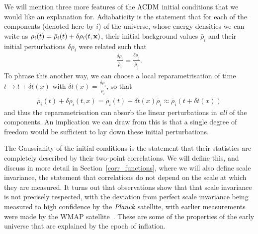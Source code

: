 

    We will mention three more features of the $\Lambda\text{CDM}$ initial conditions that we would
    like an explanation for.
    Adiabaticity is the statement that for each of the components (denoted here by $i$) of the universe,
    whose energy densities we can write as
    $\rho_i(t) = \bar{\rho}_i(t)+\delta\rho_i(t,\mathbf{x})$, their
    initial background values $\bar{\rho}_i$ and their
    initial perturbations $\delta\rho_i$ were related such that
    \begin{align}
        \frac{\delta\rho_i}{\dot{\bar{\rho}}_i} = \frac{\delta\rho_j}{\dot{\bar{\rho}}_j}.
    \end{align}
    To phrase this another way, we can choose a local reparametrisation of time $t\rightarrow t+\delta t(x)$
    with $\delta t(x)=\frac{\delta\rho_i}{\dot{\bar{\rho}}_i}$, so that
    \begin{align}
        \bar{\rho}_i(t)+\delta \rho_i(t,x) = \bar{\rho}_i(t)+\delta t(x)\dot{\bar{\rho}}_i
        \approx \bar{\rho}_i(t+\delta t(x))
    \end{align}
    and thus the reparametrisation can absorb the linear perturbations in
    \textit{all} of the components.
    An implication we can draw from this is that a single degree of freedom
    would be sufficient to lay down these initial perturbations.


    The Gaussianity of the initial conditions is the statement that their statistics are completely described by
    their two-point correlations. We will define this, and discuss in more detail
    in Section~\ref{corr_functions}, where we will also define scale invariance,
    the statement that correlations do not depend on the scale at which they are measured.
    It turns out that observations show that that scale invariance is not precisely respected,
    with the deviation from perfect scale invariance being measured to high confidence by the $\textit{Planck}$
    satellite, with
    earlier measurements were made by the WMAP satellite~\cite{Senatore_wmap_2009}.
    These are some of the properties of the early universe that are explained by the epoch of inflation.


